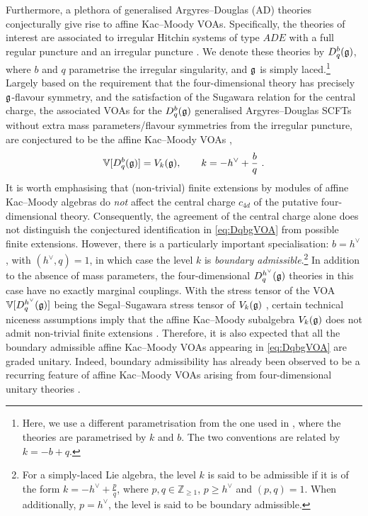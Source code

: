 Furthermore, a plethora of generalised Argyres--Douglas (AD) theories \cite{Argyres:1995jj, Argyres:1995xn, Xie:2012hs} conjecturally give rise to affine Kac--Moody VOAs. Specifically, the theories of interest are associated to irregular Hitchin systems of type $ADE$ with a full regular puncture and an irregular puncture \cite{Wang:2015mra}. We denote these theories by $D^b_q(\mathfrak{g})$, where $b$ and $q$ parametrise the irregular singularity, and $\mathfrak{g}$ is simply laced.\footnote{Here, we use a different parametrisation from the one used in \cite{Wang:2015mra,Xie:2016evu, Song:2017oew}, where the theories are parametrised by $k$ and $b$. The two conventions are related by $k = -b+q$.} Largely based on the requirement that the four-dimensional theory has precisely $\mathfrak{g}$-flavour symmetry, and the satisfaction of the Sugawara relation for the central charge, the associated VOAs for the $D_q^{b}(\mathfrak{g})$ generalised Argyres--Douglas SCFTs without extra mass parameters/flavour symmetries from the irregular puncture, are conjectured to be the affine Kac--Moody VOAs \cite{Xie:2016evu, Song:2017oew, Xie:2017aqx},
\begin{equation} \label{eq:DqbgVOA}
    \mathbb{V}[D_q^{b}(\mathfrak{g})] = V_{k}(\mathfrak{g}), \qquad k = -h^\vee + \frac{b}{q}~. 
\end{equation}
It is worth emphasising that (non-trivial) finite extensions by modules of affine Kac--Moody algebras do \emph{not} affect the central charge $c_{4d}$ of the putative four-dimensional theory. Consequently, the agreement of the central charge alone does not distinguish the conjectured identification in \eqref{eq:DqbgVOA} from possible finite extensions. However, there is a particularly important specialisation: $b = h^\vee$, with $(h^\vee, q) = 1$, in which case the level $k$ is \emph{boundary admissible}.\footnote{For a simply-laced Lie algebra, the level $k$ is said to be admissible if it is of the form $k = -h^\vee + \frac{p}{q}$, where $p,q \in \mathbb{Z}_{\geqslant 1}$, $p \geqslant h^\vee$ and $(p,q) = 1$. When additionally, $p = h^\vee$, the level is said to be boundary admissible.} In addition to the absence of mass parameters, the four-dimensional $D_q^{h^\vee}(\mathfrak{g})$ theories in this case have no exactly marginal couplings. With the stress tensor of the VOA $\mathbb{V}[D_q^{h^\vee}(\mathfrak{g})]$ being the Segal--Sugawara stress tensor of $V_{k}(\mathfrak{g})$ \cite{Beem:2018duj}, certain technical niceness assumptions imply that the affine Kac--Moody subalgebra $V_{k}(\mathfrak{g})$ does not admit non-trivial finite extensions \cite{Arakawa:2021ogm}. Therefore, it is also expected that all the boundary admissible affine Kac--Moody VOAs appearing in \eqref{eq:DqbgVOA} are graded unitary. Indeed, boundary admissibility has already been observed to be a recurring feature of affine Kac--Moody VOAs arising from four-dimensional unitary theories \cite{ArabiArdehali:2025fad, Beem:2026lkq}. 

